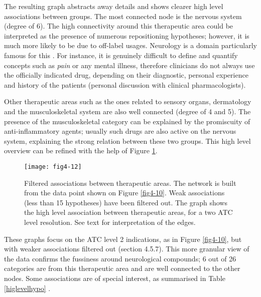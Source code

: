 The resulting graph abstracts away details and shows clearer high level associations between groups. The most connected node is the nervous system (degree of 6). The high connectivity around this therapeutic area could be interpreted as the presence of numerous repositioning hypotheses; however, it is much more likely to be due to off-label usages. Neurology is a domain particularly famous for this \citep{cras2007off}. For instance, it is genuinely difficult to define and quantify concepts such as \emph{pain} \citep{bonica1979need} or any mental illness, therefore clinicians do not always use the officially indicated drug, depending on their diagnostic, personal experience and history of the patients (personal discussion with clinical pharmacologists).

Other therapeutic areas such as the ones related to sensory organs, dermatology and the musculoskeletal system are also well connected (degree of 4 and 5). The presence of the musculoskeletal category can be explained by the promiscuity of anti-inflammatory agents; usually such drugs are also active on the nervous system, explaining the strong relation between these two groups. This high level overview can be refined with the help of Figure \ref{fig4-12}.

\begin{figure}[H]
    \centering
    \texttt{[image: fig4-12]}
    \caption{Filtered associations between therapeutic areas. The network is built from the data point shown on Figure \ref{fig4-10}. Weak associations (less than 15 hypotheses) have been filtered out. The graph shows the high level association between therapeutic areas, for a two ATC level resolution. See text for interpretation of the edges.}
    \label{fig4-12}
\end{figure}

These graphs focus on the ATC level 2 indications, as in Figure \ref{fig4-10}, but with weaker associations filtered out (section 4.5.7). This more granular view of the data confirms the fussiness around neurological compounds; 6 out of 26 categories are from this therapeutic area and are well connected to the other nodes. Some associations are of special interest, as summarised in Table \ref{higlevelhypo} .

